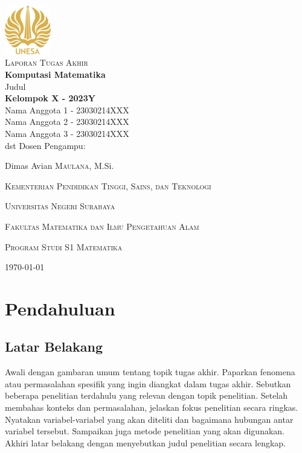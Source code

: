 \documentclass[english,12pt,a4paper]{book}
\begin{document}
	\begin{titlepage}
		\centering
		\includegraphics[width=0.15\textwidth]{logounesa.png}\\[2ex]
		{\Large \textsc{Laporan Tugas Akhir}}\\[2ex]
		{\LARGE\bfseries Komputasi Matematika}\\[8ex]
		{\large Judul}\\[7cm]
		\textbf{Kelompok X - 2023Y}\\[2ex]
			Nama Anggota 1 - 23030214XXX\\
			Nama Anggota 2 - 23030214XXX\\
			Nama Anggota 3 - 23030214XXX\\
			dst
		\vfill
		Dosen Pengampu:\par
		Dimas Avian \textsc{Maulana}, M.Si.\\
	
		\vfill
		{\large\textsc{Kementerian Pendidikan Tinggi, Sains, dan Teknologi} \par}
		{\large\textsc{Universitas Negeri Surabaya} \par}
		{\large\textsc{Fakultas Matematika dan Ilmu Pengetahuan Alam} \par}
		{\large\textsc{Program Studi S1 Matematika} \par}
		\vspace{1cm}
		{\large \today\par}
	\end{titlepage}
	
	\tableofcontents
	
\chapter{Pendahuluan}
\section{Latar Belakang}
Awali dengan gambaran umum tentang topik tugas akhir. Paparkan fenomena atau permasalahan spesifik yang ingin diangkat dalam tugas akhir. Sebutkan beberapa penelitian terdahulu yang relevan dengan topik penelitian. Setelah membahas konteks dan permasalahan, jelaskan fokus penelitian secara ringkas. Nyatakan variabel-variabel yang akan diteliti dan bagaimana hubungan antar variabel tersebut. Sampaikan juga metode penelitian yang akan digunakan. Akhiri latar belakang dengan menyebutkan judul penelitian secara lengkap.
\end{document}
